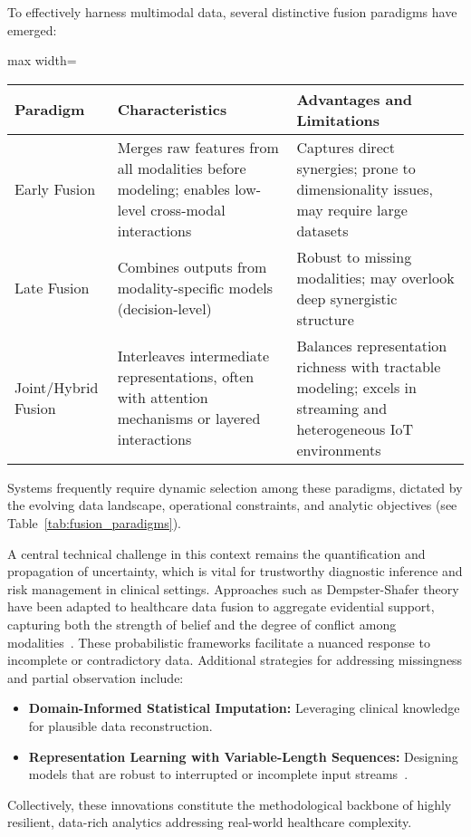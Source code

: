 To effectively harness multimodal data, several distinctive fusion paradigms have emerged:
\begin{table*}[htbp]
\centering
\caption{Comparison of Multimodal Data Fusion Paradigms}
\label{tab:fusion_paradigms}
\begin{adjustbox}{max width=\textwidth}
\begin{tabular}{lll}
\toprule
\textbf{Paradigm} & \textbf{Characteristics} & \textbf{Advantages and Limitations} \\
\midrule
Early Fusion & Merges raw features from all modalities before modeling; enables low-level cross-modal interactions & Captures direct synergies; prone to dimensionality issues, may require large datasets \\
Late Fusion & Combines outputs from modality-specific models (decision-level) & Robust to missing modalities; may overlook deep synergistic structure \\
Joint/Hybrid Fusion & Interleaves intermediate representations, often with attention mechanisms or layered interactions & Balances representation richness with tractable modeling; excels in streaming and heterogeneous IoT environments \\
\bottomrule
\end{tabular}
\end{adjustbox}
\end{table*}

Systems frequently require dynamic selection among these paradigms, dictated by the evolving data landscape, operational constraints, and analytic objectives (see Table~\ref{tab:fusion_paradigms}). 

A central technical challenge in this context remains the quantification and propagation of uncertainty, which is vital for trustworthy diagnostic inference and risk management in clinical settings. Approaches such as Dempster-Shafer theory have been adapted to healthcare data fusion to aggregate evidential support, capturing both the strength of belief and the degree of conflict among modalities~\cite{ref73}. These probabilistic frameworks facilitate a nuanced response to incomplete or contradictory data. Additional strategies for addressing missingness and partial observation include:
\begin{itemize}
    \item \textbf{Domain-Informed Statistical Imputation:} Leveraging clinical knowledge for plausible data reconstruction.
    \item \textbf{Representation Learning with Variable-Length Sequences:} Designing models that are robust to interrupted or incomplete input streams~\cite{ref76,ref77,ref84,ref89,ref90}.
\end{itemize}
Collectively, these innovations constitute the methodological backbone of highly resilient, data-rich analytics addressing real-world healthcare complexity.

